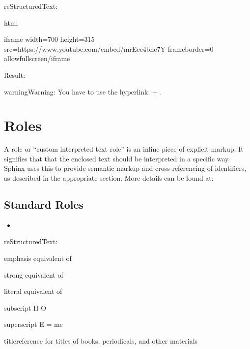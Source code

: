 \documentclass[letterpaper,12pt,english]{sphinxmanual}
\begin{document}
reStructuredText:

\begin{sphinxVerbatim}[commandchars=\\\{\}]
  html

    \PYGZlt{}iframe width=\PYGZdq{}700\PYGZdq{} height=\PYGZdq{}315\PYGZdq{}
    src=\PYGZdq{}https://www.youtube.com/embed/mrEee4bhc7Y\PYGZdq{}
    frameborder=\PYGZdq{}0\PYGZdq{} allowfullscreen\PYGZgt{}\PYGZlt{}/iframe\PYGZgt{}
\end{sphinxVerbatim}

Result:



\begin{sphinxadmonition}{warning}{Warning:}
You have to use the hyperlink:  + .
\end{sphinxadmonition}


\section{Roles}
\label{\detokenize{rtxt:roles}}
A role or “custom interpreted text role” is an inline piece of explicit markup. It signifies that that the enclosed text should be interpreted in a specific way. Sphinx uses this to provide semantic markup and cross-referencing of identifiers, as described in the appropriate section. More details can be found at: 


\subsection{Standard Roles}
\label{\detokenize{rtxt:standard-roles}}\begin{itemize}
\item {} 

\end{itemize}

reStructuredText:

\begin{sphinxVerbatim}[commandchars=\\\{\}]
 emphasis \textendash{} equivalent of 

 strong \textendash{} equivalent of 

 literal \textendash{} equivalent of 

 subscript \textendash{} H\PYGZbs{} \PYGZbs{} O

 superscript \textendash{} E = mc\PYGZbs{} 

 title\PYGZhy{}reference \textendash{} for titles of books, periodicals, and other materials
\end{sphinxVerbatim}
\end{document}
